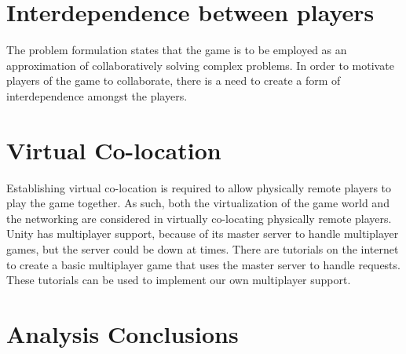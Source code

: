 	
	\section{Interdependence between players} \label{sec:interdependence}
		The problem formulation states that the game is to be employed as an 
		approximation of collaboratively solving complex problems. In order to
		motivate players of the game to collaborate, there is a need to create
		a form of interdependence amongst the players. 
		
	\section{Virtual Co-location} \label{sec:virtualcolocation}
		Establishing virtual co-location is required to allow physically remote players
		to play the game together. As such, both the virtualization of the game world and
		the networking are considered in virtually co-locating physically remote players.
		Unity has multiplayer support, because of its master server to handle multiplayer
		games, but the server could be down at times. There are tutorials on the internet
		to create a basic multiplayer game that uses the master server to handle requests.
		These tutorials can be used to implement our own multiplayer support.
		
	\section{Analysis Conclusions} \label{sec:analysisconclusion}

